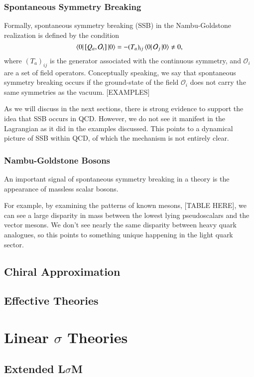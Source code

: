 \documentclass[aps,prd,onecolumn,showpacs,amsmath,amssymb,nofootinbib]{revtex4} \pdfoutput=1
\begin{document}
\subsubsection{Spontaneous Symmetry Breaking}
Formally, spontaneous symmetry breaking (SSB) in the Nambu-Goldstone realization is defined by the condition
\begin{equation}\label{eq:ssb}
    \bra{0} \left[ Q_{a},\mathcal{O}_{i}\right]\ket{0} = -(T_{a})_{ij}\bra{0}\mathcal{O}_{j}\ket{0}\neq 0,
\end{equation}
where $(T_{a})_{ij}$ is the generator associated with the continuous symmetry, and $\mathcal{O}_i$ are a set of field operators. Conceptually speaking, we say that spontaneous symmetry breaking occurs if the ground-state of the field $\mathcal{O}_{i}$ does not carry the same symmetries as the vacuum.
[EXAMPLES]

As we will discuss in the next sections, there is strong evidence to support the idea that SSB occurs in QCD. However, we do not see it manifest in the Lagrangian as it did in the examples discussed. This points to a dynamical picture of SSB within QCD, of which the mechanism is not entirely clear. 
\subsubsection{Nambu-Goldstone Bosons}
An important signal of spontaneous symmetry breaking in a theory is the appearance of massless scalar bosons.

For example, by examining the patterns of known mesons, [TABLE HERE], we can see a large disparity in mass between the lowest lying pseudoscalars and the vector mesons. 
We don't see nearly the same disparity between heavy quark analogues, so this points to something unique happening in the light quark sector.

\subsection{Chiral Approximation}
\subsection{Effective Theories}

\section{Linear $\sigma$ Theories}\label{IV}
\subsection{Extended L$\sigma$M}
\end{document}

